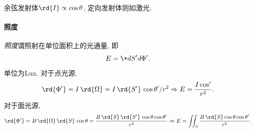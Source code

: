 \documentclass{ctexart}
\begin{document}
余弦发射体$\rd{I}\propto \cos\theta$, 定向发射体则如激光.


\paragraph{照度} %
\label{par:照度}

\emph{照度}谓照射在单位面积上的光通量, 即
\[ E = \+d{S'}d{\Phi'}. \]
单位为Lux. 对于点光源,
\[ \rd{\Phi'} = I\,\rd{\Omega} = I\,\rd{S'}\,\cos\theta' / r^2\Rightarrow E = \frac{I\cos'}{r^2}. \]
对于面光源,
\[ \rd{\Phi'} = B\,\rd{\Omega}\,\rd{S}\,\cos\theta = \frac{B\,\rd{S}\,\rd{S'}\,\cos\theta\cos\theta'}{r^2}\Rightarrow E= \iint_S \frac{B\,\rd{S} \cos\theta\cos\theta'}{r^2}. \]

\end{document}
